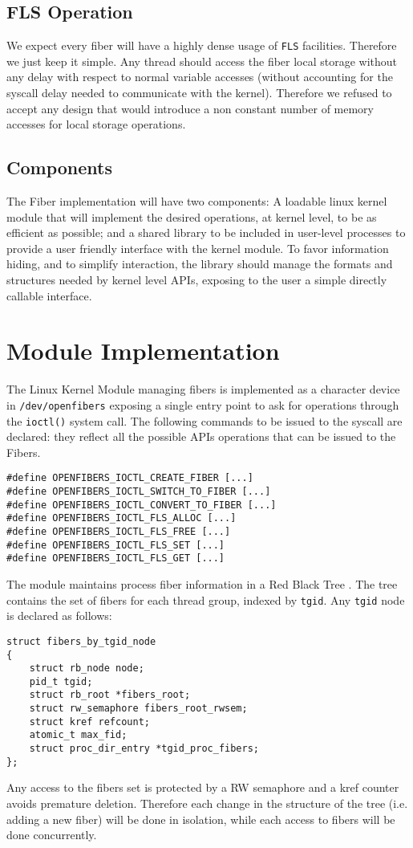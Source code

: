 \documentclass[11pt]{article}
\begin{document}
\subsection{FLS Operation}
We expect every fiber will have a highly dense usage of {\tt FLS} facilities. Therefore we just keep it simple. Any thread should access the fiber local storage without any delay with respect to normal variable accesses (without accounting for the syscall delay needed to communicate with the kernel). Therefore we refused to accept any design that would introduce a non constant number of memory accesses for local storage operations.

\subsection{Components}
The Fiber implementation will have two components: A loadable linux kernel module that will implement the desired operations, at kernel level, to be as efficient as possible; and a shared library to be included in user-level processes to provide a user friendly interface with the kernel module. To favor information hiding, and to simplify interaction, the library should manage the formats and structures needed by kernel level APIs, exposing to the user a simple directly callable interface.


\section{Module Implementation}
The Linux Kernel Module managing fibers is implemented as a character device in {\tt /dev/openfibers} exposing a single entry point to ask for operations through the {\tt ioctl()} system call. The following commands to be issued to the syscall are declared: they reflect all the possible APIs operations that can be issued to the Fibers.

\begin{lstlisting}
#define OPENFIBERS_IOCTL_CREATE_FIBER [...]
#define OPENFIBERS_IOCTL_SWITCH_TO_FIBER [...]
#define OPENFIBERS_IOCTL_CONVERT_TO_FIBER [...]
#define OPENFIBERS_IOCTL_FLS_ALLOC [...]
#define OPENFIBERS_IOCTL_FLS_FREE [...]
#define OPENFIBERS_IOCTL_FLS_SET [...]
#define OPENFIBERS_IOCTL_FLS_GET [...]
\end{lstlisting}

The module maintains process fiber information in a Red Black Tree \cite{rbtree}. The tree contains the set of fibers for each thread group, indexed by {\tt tgid}. Any {\tt tgid} node is declared as follows:
\begin{lstlisting}
struct fibers_by_tgid_node
{
    struct rb_node node;
    pid_t tgid;
    struct rb_root *fibers_root;
    struct rw_semaphore fibers_root_rwsem;
    struct kref refcount;
    atomic_t max_fid;
    struct proc_dir_entry *tgid_proc_fibers;
};
\end{lstlisting}
Any access to the fibers set is protected by a RW semaphore and a kref counter avoids premature deletion. Therefore each change in the structure of the tree (i.e. adding a new fiber) will be done in isolation, while each access to fibers will be done concurrently.
\end{document}
